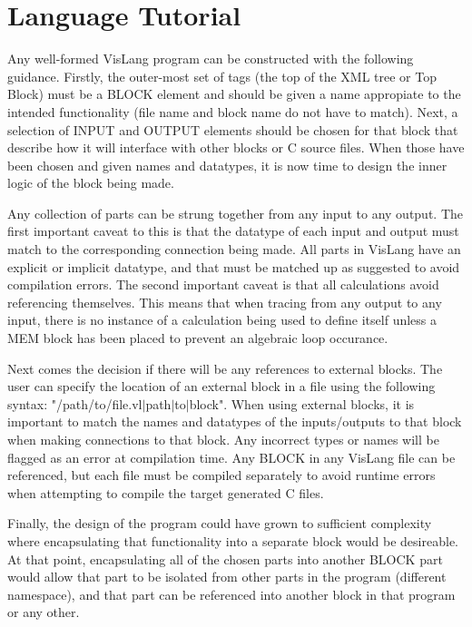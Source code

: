 \section{Language Tutorial}

Any well-formed VisLang program can be constructed with the following guidance. Firstly,
the outer-most set of tags (the top of the XML tree or Top Block) must be a BLOCK element
and should be given a name appropiate to the intended functionality (file name and block
name do not have to match). Next, a selection of INPUT and OUTPUT elements should be chosen
for that block that describe how it will interface with other blocks or C source files.
When those have been chosen and given names and datatypes, it is now time to design the
inner logic of the block being made.
\par
Any collection of parts can be strung together
from any input to any output. The first important caveat to this is that the datatype
of each input and output must match to the corresponding connection being made. All parts
in VisLang have an explicit or implicit datatype, and that must be matched up as suggested
to avoid compilation errors. The second important caveat is that all calculations avoid
referencing themselves. This means that when tracing from any output to any input, there
is no instance of a calculation being used to define itself unless a MEM block has been
placed to prevent an algebraic loop occurance.
\par
Next comes the decision if there will be any references to external blocks.
The user can specify the location of an external block in a file using the following syntax:
"/path/to/file.vl$\vert$path$\vert$to$\vert$block". When using external blocks, it is
important to match the names and datatypes of the inputs/outputs to that block when
making connections to that block. Any incorrect types or names will be flagged as an error
at compilation time. Any BLOCK in any VisLang file can be referenced, but each file
must be compiled separately to avoid runtime errors when attempting to compile the target
generated C files.
\par
Finally, the design of the program could have grown to sufficient complexity where
encapsulating that functionality into a separate block would be desireable. At that point,
encapsulating all of the chosen parts into another BLOCK part would allow that part to
be isolated from other parts in the program (different namespace), and that part can be
referenced into another block in that program or any other.
\par
